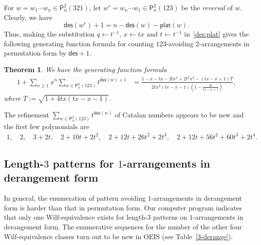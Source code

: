 \documentclass[12pt]{amsart}
\numberwithin{equation}{section}
\theoremstyle{plain}
\newtheorem{theorem}{Theorem}[section]
\theoremstyle{definition}
\renewcommand\P{\mathsf{P}}
\def\plat{\mathsf{plat}}
\def\des{\mathsf{des}}
\begin{document}
For  $w=w_1\cdots w_n\in\P_n^2(321)$, let $w^r=w_n\cdots w_1\in\P_n^2(123)$ be the {\em reversal} of $w$. Clearly, we have 
$$
\des(w^r)+1=n-\des(w)-\plat(w). 
$$
Thus, making the substitution $q\leftarrow t^{-1}$, $x\leftarrow tx$ and $t\leftarrow t^{-1}$ in~\eqref{des:plat}  gives the following generating function formula for counting $123$-avoiding $2$-arrangements in permutation form by $\des+1$. 
\begin{theorem}
We have the generating function formula
\begin{align}\label{123:2des}

1+\sum_{n\geq1}x^n\sum_{w\in\P_n^2(123)} t^{\des(w)+1} &=\frac{1-x-tx-2tx^2+2t^2x^2-(tx-x+1)T}{2tx^2(tx-x-1)(1-\frac{2t}{tx-x+1})},
\end{align}
where $T:=\sqrt{1+4tx(tx-x-1)}$.
\end{theorem}
The refinement $\sum_{w\in\P_n^2(123)} t^{\des(w)}$ of Catalan numbers appears to be new and the first few polynomials are
\begin{align*}
1,\quad2,\quad3+2t,\quad2+10t+2t^2, \quad2+12t+26t^2+2t^3,\quad 2+12t+56t^2+60t^3+2t^4. 
\end{align*}


\subsection{\texorpdfstring{Length-$3$ patterns for $1$-arrangements}{Length-3 patterns for 1-arrangements} in derangement form}


In general, the enumeration  of pattern avoiding $1$-arrangements in derangement form is harder than that in permutation form. Our computer program indicates that only one Wilf-equivalence exists for length-$3$ patterns on 
$1$-arrangements in derangement form. The enumerative sequences for the number of the other four Wilf-equivalence classes turn out to be new in OEIS (see Table~\ref{3-derange}). 
\end{document}
